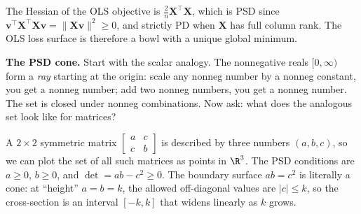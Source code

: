 \documentclass[main.tex]{subfiles}
\begin{document}
The Hessian of the OLS objective is $\frac{2}{n}\mathbf{X}^\top\mathbf{X}$, which is PSD since $\mathbf{v}^\top\mathbf{X}^\top\mathbf{X}\mathbf{v} = \|\mathbf{X}\mathbf{v}\|^2 \geq 0$, and strictly PD when $\mathbf{X}$ has full column rank. The OLS loss surface is therefore a bowl with a unique global minimum.

\textbf{The PSD cone.} Start with the scalar analogy. The nonnegative reals $[0, \infty)$ form a \textit{ray} starting at the origin: scale any nonneg number by a nonneg constant, you get a nonneg number; add two nonneg numbers, you get a nonneg number. The set is closed under nonneg combinations. Now ask: what does the analogous set look like for matrices?

A $2 \times 2$ symmetric matrix $\begin{bmatrix}a & c \\ c & b\end{bmatrix}$ is described by three numbers $(a, b, c)$, so we can plot the set of all such matrices as points in $\R^3$. The PSD conditions are $a \geq 0$, $b \geq 0$, and $\det = ab - c^2 \geq 0$. The boundary surface $ab = c^2$ is literally a cone: at ``height'' $a = b = k$, the allowed off-diagonal values are $|c| \leq k$, so the cross-section is an interval $[-k, k]$ that widens linearly as $k$ grows.
\end{document}
